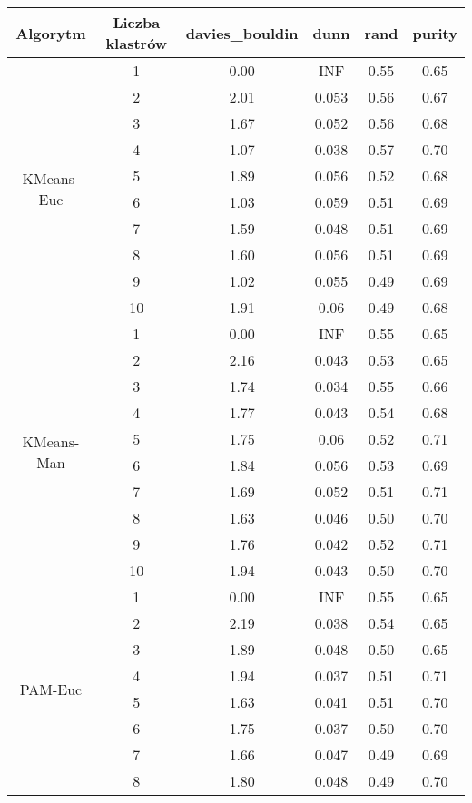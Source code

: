 \begin{table}[H]
\centering
\begin{tabular}{cc|cccc}
  \hline
Algorytm & Liczba klastrów & davies\_bouldin & dunn & rand & purity \\ 
  \hline
  \multirow{10}{*}{KMeans-Euc} & 1 & 0.00 & INF & 0.55 & 0.65 \\ 
   & 2 & 2.01 & 0.053 & 0.56 & 0.67 \\ 
   & 3 & 1.67 & 0.052 & 0.56 & 0.68 \\ 
   & 4 & 1.07 & 0.038 & 0.57 & 0.70 \\ 
   & 5 & 1.89 & 0.056 & 0.52 & 0.68 \\ 
   & 6 & 1.03 & 0.059 & 0.51 & 0.69 \\ 
   & 7 & 1.59 & 0.048 & 0.51 & 0.69 \\ 
   & 8 & 1.60 & 0.056 & 0.51 & 0.69 \\ 
   & 9 & 1.02 & 0.055 & 0.49 & 0.69 \\ 
   & 10 & 1.91 & 0.06 & 0.49 & 0.68 \\  \hline \hline
  \multirow{10}{*}{KMeans-Man} & 1 & 0.00 & INF & 0.55 & 0.65 \\ 
  & 2 & 2.16 & 0.043 & 0.53 & 0.65 \\ 
  & 3 & 1.74 & 0.034 & 0.55 & 0.66 \\ 
  & 4 & 1.77 & 0.043 & 0.54 & 0.68 \\ 
  & 5 & 1.75 & 0.06 & 0.52 & 0.71 \\ 
  & 6 & 1.84 & 0.056 & 0.53 & 0.69 \\ 
  & 7 & 1.69 & 0.052 & 0.51 & 0.71 \\ 
  & 8 & 1.63 & 0.046 & 0.50 & 0.70 \\ 
  & 9 & 1.76 & 0.042 & 0.52 & 0.71 \\ 
  & 10 & 1.94 & 0.043 & 0.50 & 0.70 \\ \hline \hline
  \multirow{10}{*}{PAM-Euc} & 1 & 0.00 & INF & 0.55 & 0.65 \\ 
  & 2 & 2.19 & 0.038 & 0.54 & 0.65 \\ 
  & 3 & 1.89 & 0.048 & 0.50 & 0.65 \\ 
  & 4 & 1.94 & 0.037 & 0.51 & 0.71 \\ 
  & 5 & 1.63 & 0.041 & 0.51 & 0.70 \\ 
  & 6 & 1.75 & 0.037 & 0.50 & 0.70 \\ 
  & 7 & 1.66 & 0.047 & 0.49 & 0.69 \\ 
  & 8 & 1.80 & 0.048 & 0.49 & 0.70 \\ 

\end{tabular}
\end{table}
